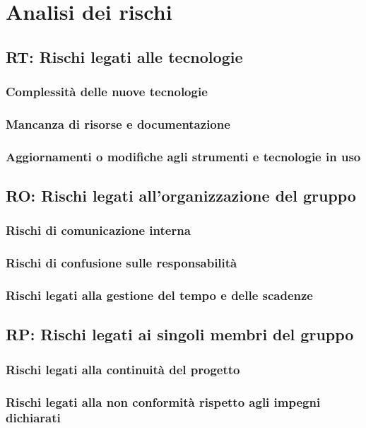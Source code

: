  
\section{Analisi dei rischi}
\subsection{RT: Rischi legati alle tecnologie}
\subsubsection{Complessità delle nuove tecnologie}
\subsubsection{Mancanza di risorse e documentazione}
\subsubsection{Aggiornamenti o modifiche agli strumenti e tecnologie in uso}
\subsection{RO: Rischi legati all'organizzazione del gruppo}
\subsubsection{Rischi di comunicazione interna}
\subsubsection{Rischi di confusione sulle responsabilità}
\subsubsection{Rischi legati alla gestione del tempo e delle scadenze}
\subsection{RP: Rischi legati ai singoli membri del gruppo}
\subsubsection{Rischi legati alla continuità del progetto}
\subsubsection{Rischi legati alla non conformità rispetto agli impegni dichiarati}